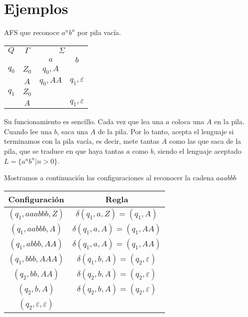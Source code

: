 \chapter{Ejemplos}
\begin{ex}
AFS que reconoce $a^nb^n$ por pila vacía. 
\begin{center}
\begin{tabular}{|l|c|c|c|}
\hline 
$Q$ & $\Gamma $ & \multicolumn{2}{|c|}{$\Sigma $} \\ \cline{3-4}
 & & $a$ & $b$ \\ \hline
$q_0$ & $Z_0$ & $q_0,A$ & \\ \cline{2-4}
 & $A$ & $q_0,AA$ & $q_1,\varepsilon $ \\ \hline
$q_1$ & $Z_0$ &  & \\ \cline{2-4}
 & $A$ &  & $q_1,\varepsilon $ \\ \hline
\end{tabular}
\end{center}
Su funcionamiento es sencillo. Cada vez que lea una $a$ coloca una $A$ en la pila. Cuando lee una $b$, saca una $A$ de la pila. Por lo tanto, acepta el lenguaje si terminamos con la pila vacía, es decir, mete tantas $A$ como las que saca de la pila, que se traduce en que haya tantas $a$ como $b$, siendo el lenguaje aceptado $L=\{a^nb^n | n>0\}$.

Mostramos a continuación las configuraciones al reconocer la cadena $aaabbb$

\begin{center}
\begin{tabular}{|c|c|}
\hline
\textbf{Configuración} & \textbf{Regla} \\ \hline
$(q_1,aaabbb,Z)$ & $\delta(q_1,a,Z)=(q_1,A)$ \\ \hline
$(q_1,aabbb,A)$ & $\delta(q_1,a,A) = (q_1,AA)$ \\ \hline
$(q_1,abbb,AA)$ & $\delta(q_1,a,A)=(q_1,AA)$ \\ \hline
$(q_1,bbb,AAA)$ & $\delta(q_1,b,A)=(q_2,\varepsilon)$ \\ \hline
$(q_2,bb,AA)$ & $\delta(q_2,b,A)=(q_2,\varepsilon)$ \\ \hline
$(q_2,b,A)$ & $\delta(q_2,b,A)=(q_2,\varepsilon)$ \\ \hline
$(q_2,\varepsilon, \varepsilon )$ & \\ \hline
\end{tabular}
\end{center}
\end{ex}

